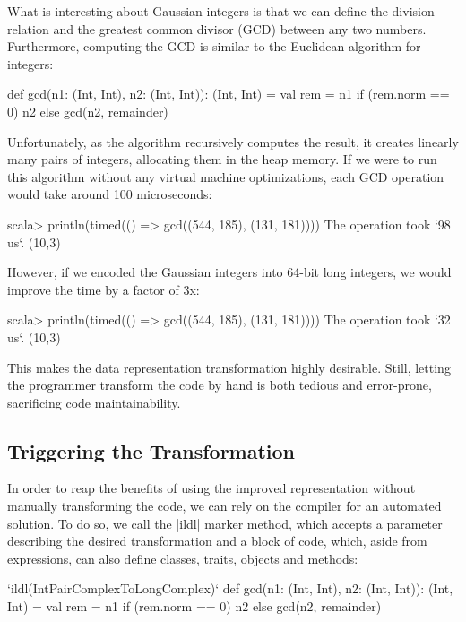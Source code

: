 What is interesting about Gaussian integers is that we can define the division relation and the greatest common divisor (GCD) between any two numbers. Furthermore, computing the GCD is similar to the Euclidean algorithm for integers:

\begin{lstlisting-nobreak}
def gcd(n1: (Int, Int), n2: (Int, Int)): (Int, Int) = {
  val rem = n1 %
  if (rem.norm == 0) n2 else gcd(n2, remainder)
}
\end{lstlisting-nobreak}

Unfortunately, as the algorithm recursively computes the result, it creates linearly many pairs of integers, allocating them in the heap memory. If we were to run this algorithm without any virtual machine optimizations, each GCD operation would take around 100 microseconds:

\begin{lstlisting-nobreak}
scala>   println(timed(() => gcd((544, 185), (131, 181))))
The operation took `98 us`.
(10,3)
\end{lstlisting-nobreak}

However, if we encoded the Gaussian integers into 64-bit long integers, we would improve the time by a factor of 3x:

\begin{lstlisting-nobreak}
scala> println(timed(() => gcd((544, 185), (131, 181))))
The operation took `32 us`.
(10,3)
\end{lstlisting-nobreak}

This makes the data representation transformation highly desirable. Still, letting the programmer transform the code by hand is both tedious and error-prone, sacrificing code maintainability.

\subsection{Triggering the Transformation}

In order to reap the benefits of using the improved representation without manually transforming the code, we can rely on the compiler for an automated solution. To do so, we call the |ildl| marker method, which accepts a parameter describing the desired transformation and a block of code, which, aside from expressions, can also define classes, traits, objects and methods:

\begin{lstlisting-nobreak}
`ildl(IntPairComplexToLongComplex)` {
  def gcd(n1: (Int, Int), n2: (Int, Int)): (Int, Int) = {
    val rem = n1 %
    if (rem.norm == 0) n2 else gcd(n2, remainder)
  }
}
\end{lstlisting-nobreak}

